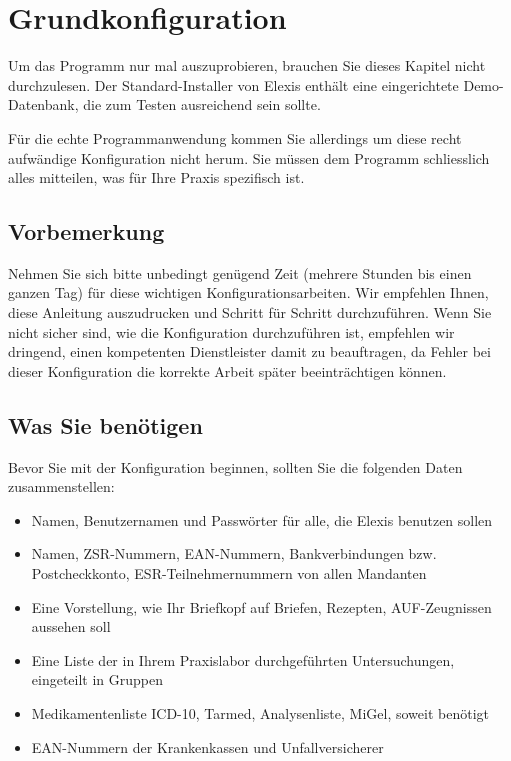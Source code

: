 %


\section{Grundkonfiguration}
Um das Programm nur mal auszuprobieren, brauchen Sie dieses Kapitel nicht durchzulesen. Der Standard-Installer von Elexis enthält eine eingerichtete Demo-Datenbank, die zum Testen ausreichend sein sollte.

Für die echte Programmanwendung kommen Sie allerdings um diese recht aufwändige Konfiguration nicht herum. Sie müssen 
dem Programm schliesslich alles mitteilen, was für Ihre Praxis spezifisch ist.

\subsection{Vorbemerkung}
Nehmen Sie sich bitte unbedingt genügend Zeit (mehrere Stunden bis einen ganzen Tag) für diese wichtigen Konfigurationsarbeiten. Wir 
empfehlen Ihnen, diese Anleitung auszudrucken und Schritt für Schritt durchzuführen.
Wenn Sie nicht sicher sind, wie die Konfiguration durchzuführen ist, empfehlen wir dringend, einen kompetenten Dienstleister damit zu beauftragen, da Fehler bei dieser Konfiguration die korrekte Arbeit später beeinträchtigen können. 

\subsection{Was Sie benötigen}
Bevor Sie mit der Konfiguration beginnen, sollten Sie die folgenden Daten zusammenstellen:
\begin{itemize}
  \item Namen, Benutzernamen und Passwörter für alle, die Elexis benutzen sollen
  \item Namen, ZSR-Nummern, EAN-Nummern, Bankverbindungen bzw. Postcheckkonto, ESR-Teilnehmernummern von allen Mandanten
  \item Eine Vorstellung, wie Ihr Briefkopf auf Briefen, Rezepten, AUF-Zeugnissen aussehen soll
  \item Eine Liste der in Ihrem Praxislabor durchgeführten Untersuchungen, eingeteilt in Gruppen
  \item Medikamentenliste ICD-10, Tarmed, Analysenliste, MiGel, soweit benötigt 
  \item EAN-Nummern der Krankenkassen und Unfallversicherer
\end{itemize} 
